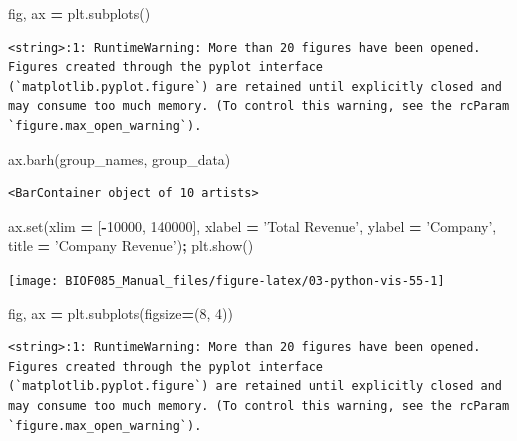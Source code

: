 \documentclass[
  letterpaper,
]{scrbook}
\newenvironment{Shaded}{\begin{snugshade}}{\end{snugshade}}
\newcommand{\BuiltInTok}[1]{#1}
\newcommand{\DecValTok}[1]{\textcolor[rgb]{0.00,0.00,0.81}{#1}}
\newcommand{\NormalTok}[1]{#1}
\newcommand{\OperatorTok}[1]{\textcolor[rgb]{0.81,0.36,0.00}{\textbf{#1}}}
\newcommand{\StringTok}[1]{\textcolor[rgb]{0.31,0.60,0.02}{#1}}
\begin{document}
\begin{Shaded}
\begin{Highlighting}[]
\NormalTok{fig, ax }\OperatorTok{=}\NormalTok{ plt.subplots()}
\end{Highlighting}
\end{Shaded}

\begin{verbatim}
<string>:1: RuntimeWarning: More than 20 figures have been opened. Figures created through the pyplot interface (`matplotlib.pyplot.figure`) are retained until explicitly closed and may consume too much memory. (To control this warning, see the rcParam `figure.max_open_warning`).
\end{verbatim}

\begin{Shaded}
\begin{Highlighting}[]
\NormalTok{ax.barh(group_names, group_data)}
\end{Highlighting}
\end{Shaded}

\begin{verbatim}
<BarContainer object of 10 artists>
\end{verbatim}

\begin{Shaded}
\begin{Highlighting}[]
\NormalTok{ax.}\BuiltInTok{set}\NormalTok{(xlim }\OperatorTok{=}\NormalTok{ [}\OperatorTok{-}\DecValTok{10000}\NormalTok{, }\DecValTok{140000}\NormalTok{], xlabel }\OperatorTok{=} \StringTok{'Total Revenue'}\NormalTok{, ylabel }\OperatorTok{=} \StringTok{'Company'}\NormalTok{, }
\NormalTok{       title }\OperatorTok{=} \StringTok{'Company Revenue'}\NormalTok{)}\OperatorTok{;}
\NormalTok{plt.show()}
\end{Highlighting}
\end{Shaded}

\begin{center}\texttt{[image: BIOF085\_Manual\_files/figure-latex/03-python-vis-55-1]} \end{center}

\begin{Shaded}
\begin{Highlighting}[]
\NormalTok{fig, ax }\OperatorTok{=}\NormalTok{ plt.subplots(figsize}\OperatorTok{=}\NormalTok{(}\DecValTok{8}\NormalTok{, }\DecValTok{4}\NormalTok{))}
\end{Highlighting}
\end{Shaded}

\begin{verbatim}
<string>:1: RuntimeWarning: More than 20 figures have been opened. Figures created through the pyplot interface (`matplotlib.pyplot.figure`) are retained until explicitly closed and may consume too much memory. (To control this warning, see the rcParam `figure.max_open_warning`).
\end{verbatim}
\end{document}

